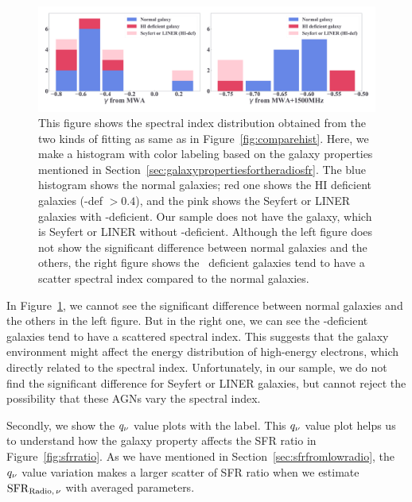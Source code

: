 \begin{figure}[htbp]
	\centering
	\includegraphics[width=\linewidth]{Chapter_6/Figures/Discuss_comparehist.pdf}
    \caption[Histograms of $\gamma$ from the fitting (labeled)]{\label{fig:comparehist_h1def}
        This figure shows the spectral index distribution obtained from the two kinds of fitting as same as in Figure~\ref{fig:comparehist}.
        Here, we make a histogram with color labeling based on the galaxy properties mentioned in Section~\ref{sec:galaxypropertiesfortheradiosfr}.
        The blue histogram shows the normal galaxies; red one shows the HI deficient galaxies (\nh-def $> 0.4$), and the pink shows the Seyfert or LINER galaxies with \nh-deficient.
        Our sample does not have the galaxy, which is Seyfert or LINER without \nh-deficient.
        Although the left figure does not show the significant difference between normal galaxies and the others, the right figure shows the \nh~deficient galaxies tend to have a scatter spectral index compared to the normal galaxies.
    }
\end{figure}

In Figure~\ref{fig:comparehist_h1def}, we cannot see the significant difference between normal galaxies and the others in the left figure.
But in the right one, we can see the \nh-deficient galaxies tend to have a scattered spectral index.
This suggests that the galaxy environment might affect the energy distribution of high-energy electrons, which directly related to the spectral index.
Unfortunately, in our sample, we do not find the significant difference for Seyfert or LINER galaxies, but cannot reject the possibility that these AGNs vary the spectral index.

Secondly, we show the $q_{\nu}$ value plots with the label.
This $q_{\nu}$ value plot helps us to understand how the galaxy property affects the SFR ratio in Figure~\ref{fig:sfrratio}.
As we have mentioned in Section~\ref{sec:sfrfromlowradio}, the $q_{\nu}$ value variation makes a larger scatter of SFR ratio when we estimate $\mathrm{SFR}_{\mathrm{Radio},\,\nu}$ with averaged parameters.

